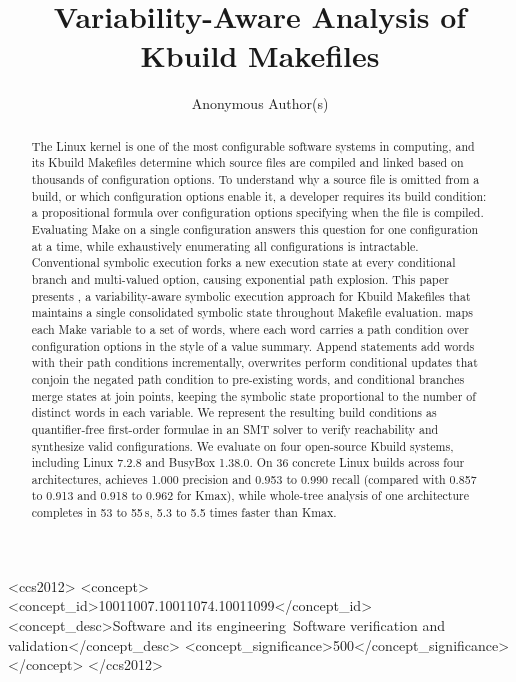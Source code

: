 \documentclass[acmsmall,screen,review,anonymous,nonacm]{acmart}
\begin{document}
\title{Variability-Aware Analysis of Kbuild Makefiles}

\author{Anonymous Author(s)}
\renewcommand{\shortauthors}{Anonymous Author(s)}

\begin{abstract}
  The Linux kernel is one of the most configurable software systems in computing, and its Kbuild Makefiles determine which source files are compiled and linked based on thousands of configuration options.
  To understand why a source file is omitted from a build, or which configuration options enable it, a developer requires its build condition: a propositional formula over configuration options specifying when the file is compiled.
  Evaluating Make on a single configuration answers this question for one configuration at a time, while exhaustively enumerating all configurations is intractable.
  Conventional symbolic execution forks a new execution state at every conditional branch and multi-valued option, causing exponential path explosion.
  This paper presents \tool{}, a variability-aware symbolic execution approach for Kbuild Makefiles that maintains a single consolidated symbolic state throughout Makefile evaluation.
  \tool{} maps each Make variable to a set of words, where each word carries a path condition over configuration options in the style of a value summary.
  Append statements add words with their path conditions incrementally, overwrites perform conditional updates that conjoin the negated path condition to pre-existing words, and conditional branches merge states at join points, keeping the symbolic state proportional to the number of distinct words in each variable.
  We represent the resulting build conditions as quantifier-free first-order formulae in an SMT solver to verify reachability and synthesize valid configurations.
  We evaluate \tool{} on four open-source Kbuild systems, including Linux 7.2.8 and BusyBox 1.38.0.
  On 36 concrete Linux builds across four architectures, \tool{} achieves 1.000 precision and 0.953 to 0.990 recall (compared with 0.857 to 0.913 and 0.918 to 0.962 for Kmax), while whole-tree analysis of one architecture completes in 53 to 55\,s, 5.3 to 5.5 times faster than Kmax.
\end{abstract}

\begin{CCSXML}
<ccs2012>
<concept>
<concept_id>10011007.10011074.10011099</concept_id>
<concept_desc>Software and its engineering~Software verification and validation</concept_desc>
<concept_significance>500</concept_significance>
</concept>
</ccs2012>
\end{CCSXML}
\end{document}
